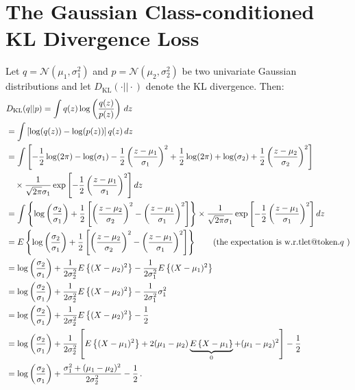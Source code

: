 \documentclass[accepted]{uai2022} %
\makeatletter
\DeclareRobustCommand\onedot{\futurelet\@let@token\@onedot}
\def\@onedot{\ifx\@let@token.\else.\null\fi\xspace}
\def\wrt{w.r.t\onedot}
\newcommand{\Ncal}{\mathcal{N}}
\makeatother
\begin{document}
\section{The Gaussian Class-conditioned KL Divergence Loss}
Let $q= \Ncal(\mu_1,\sigma_1^2)$ and $p=\Ncal(\mu_2,\sigma_2^2)$ be two univariate Gaussian distributions and let $D_{\mathrm{KL}}(\cdot||\cdot) $ denote the KL divergence.
Then: 
\begin{align}
    &D_{\mathrm{KL}}(q||p) = \int q(z)\log\left(\frac{q(z)}{p(z)}\right) \,dz
    \\ &= \int \left[\log( q(z)) - \log( p(z)) \right] q(z) \,dz\\
    &=\int \left[ -\frac{1}{2} \log(2\pi) - \log(\sigma_1) - \frac{1}{2} \left(\frac{z-\mu_1}{\sigma_1}\right)^2 + \frac{1}{2}\log(2\pi) + \log(\sigma_2) + \frac{1}{2} \left(\frac{z-\mu_2}{\sigma_2}\right)^2  \right] \nonumber \\
    &
    \quad
    \times \frac{1}{\sqrt{2\pi}\sigma_1} \exp\left[-\frac{1}{2}\left(\frac{z-\mu_1}{\sigma_1}\right)^2\right] dz\\
    &=\int \left\{\log\left(\frac{\sigma_2}{\sigma_1}\right) + \frac{1}{2} \left[ \left(\frac{z-\mu_2}{\sigma_2}\right)^2 - \left(\frac{z-\mu_1}{\sigma_1}\right)^2 \right] \right\}
    \times 
    \frac{1}{\sqrt{2\pi}\sigma_1} \exp\left[-\frac{1}{2}\left(\frac{z-\mu_1}{\sigma_1}\right)^2\right] dz\\
    &=E \left\{\log\left(\frac{\sigma_2}{\sigma_1}\right) + \frac{1}{2} \left[ \left(\frac{z-\mu_2}{\sigma_2}\right)^2 - \left(\frac{z-\mu_1}{\sigma_1}\right)^2 \right]\right\}  \qquad \text{(the expectation is \wrt  $q$ )}
    \\
    &=\log\left(\frac{\sigma_2}{\sigma_1}\right) + \frac{1}{2\sigma_2^2} E \left\{(X-\mu_2)^2\right\} - \frac{1}{2\sigma_1^2} E \left\{(X-\mu_1)^2\right\} \\
     &=\log\left(\frac{\sigma_2}{\sigma_1}\right) + \frac{1}{2\sigma_2^2} E \left\{(X-\mu_2)^2\right\} - \frac{1}{2\sigma_1^2}  \sigma_1^2 \\
    &=\log\left(\frac{\sigma_2}{\sigma_1}\right) + \frac{1}{2\sigma_2^2} E \left\{(X-\mu_2)^2\right\} - \frac{1}{2}\\ 
    &=\log\left(\frac{\sigma_2}{\sigma_1}\right) + \frac{1}{2\sigma_2^2}\left[E\left\{(X-\mu_1)^2\right\} + 2(\mu_1-\mu_2)\underbrace{E\left\{X-\mu_1\right\}}_{0} + (\mu_1-\mu_2)^2\right] - \frac{1}{2}\\
    &=\log\left(\frac{\sigma_2}{\sigma_1}\right) + \frac{\sigma_1^2 + (\mu_1-\mu_2)^2}{2\sigma_2^2} - \frac{1}{2}\, . \label{eqn:kl}
\end{align}
\end{document}
